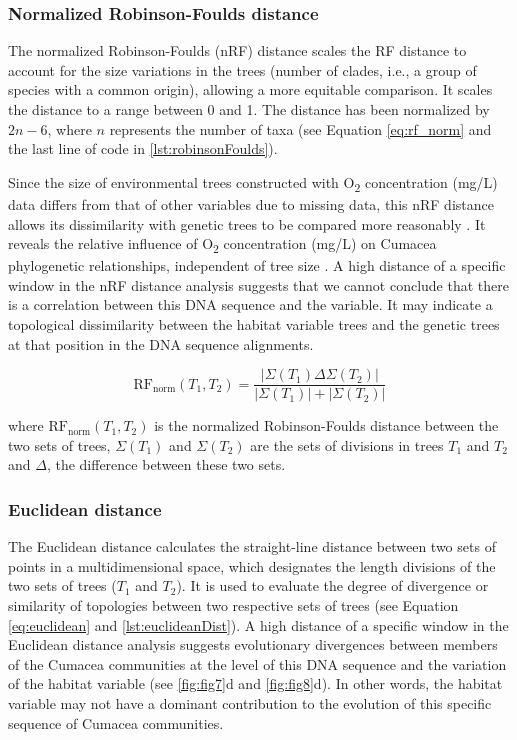 \subsubsection{Normalized Robinson-Foulds distance}\label{RFnorm}
The normalized Robinson-Foulds (nRF) distance scales the RF distance to account for the size variations in the trees (number of clades, i.e., a group of species with a common origin), allowing a more equitable comparison. It scales the distance to a range between 0 and 1. The distance has been normalized by $2n-6$, where $n$ represents the number of taxa (see Equation \eqref{eq:rf_norm} and the last line of code in \autoref{lst:robinsonFoulds}).

Since the size of environmental trees constructed with O\textsubscript{2} concentration (mg/L) data differs from that of other variables due to missing data, this nRF distance allows its dissimilarity with genetic trees to be compared more reasonably \citep{tahiri2018new, koshkarov_phylogeography_2022}. It reveals the relative influence of O\textsubscript{2} concentration (mg/L) on Cumacea phylogenetic relationships, independent of tree size \citep{tahiri2018new, koshkarov_phylogeography_2022}. A high distance of a specific window in the nRF distance analysis suggests that we cannot conclude that there is a correlation between this DNA sequence and the variable. It may indicate a topological dissimilarity between the habitat variable trees and the genetic trees at that position in the DNA sequence alignments.

\begin{equation}\label{eq:rf_norm}
    \text{RF}_{\text{norm}}(T_1, T_2) = \frac{| \Sigma(T_1) \Delta \Sigma(T_2) |}{| \Sigma(T_1) | + | \Sigma(T_2) |}
\end{equation}

where $\text{RF}_{\text{norm}}(T_1, T_2)$ is the normalized Robinson-Foulds distance between the two sets of trees, $\Sigma(T_1)$ and $\Sigma(T_2)$ are the sets of divisions in trees $T_1$ and $T_2$ and $ \Delta $, the difference between these two sets.

\subsubsection{Euclidean distance}\label{euclidean}
The Euclidean distance calculates the straight-line distance between two sets of points in a multidimensional space, which designates the length divisions of the two sets of trees ($T_1$ and $T_2$). It is used to evaluate the degree of divergence or similarity of topologies between two respective sets of trees (see Equation \eqref{eq:euclidean} and \autoref{lst:euclideanDist}).
A high distance of a specific window in the Euclidean distance analysis suggests evolutionary divergences between members of the Cumacea communities at the level of this DNA sequence and the variation of the habitat variable (see \autoref{fig:fig7}d and \autoref{fig:fig8}d). In other words, the habitat variable may not have a dominant contribution to the evolution of this specific sequence of Cumacea communities.

